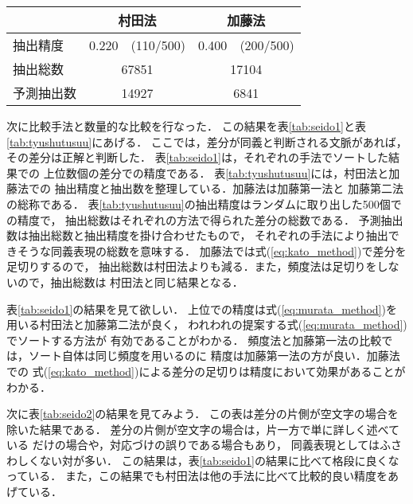 \begin{table*}[t]
  \begin{center}
    \leavevmode
    \caption{抽出精度と抽出数}
    \label{tab:tyushutusuu}
\begin{tabular}[h]{|l|r@{ }c|r@{ }c|}\hline
\multicolumn{1}{|c|}{} & \multicolumn{2}{|c|}{村田法} & \multicolumn{2}{|c|}{加藤法} \\\hline
抽出精度     & 0.220 & (110/500)& 0.400 & (200/500)\\
抽出総数     & \multicolumn{2}{|c|}{67851} & \multicolumn{2}{|c|}{17104} \\
予測抽出数   & \multicolumn{2}{|c|}{14927} & \multicolumn{2}{|c|}{6841} \\\hline
\end{tabular}
\end{center}
\end{table*}

次に比較手法と数量的な比較を行なった．
この結果を表\ref{tab:seido1}と表\ref{tab:tyushutusuu}にあげる．
ここでは，差分が同義と判断される文脈があれば，
その差分は正解と判断した．
表\ref{tab:seido1}は，それぞれの手法でソートした結果での
上位数個の差分での精度である．
表\ref{tab:tyushutusuu}には，村田法と加藤法での
抽出精度と抽出数を整理している．加藤法は加藤第一法と
加藤第二法の総称である．
表\ref{tab:tyushutusuu}の抽出精度はランダムに取り出した500個での精度で，
抽出総数はそれぞれの方法で得られた差分の総数である．
予測抽出数は抽出総数と抽出精度を掛け合わせたもので，
それぞれの手法により抽出できそうな同義表現の総数を意味する．
加藤法では式(\ref{eq:kato_method})で差分を足切りするので，
抽出総数は村田法よりも減る．また，頻度法は足切りをしないので，抽出総数は
村田法と同じ結果となる．

表\ref{tab:seido1}の結果を見て欲しい．
上位での精度は式(\ref{eq:murata_method})を用いる村田法と加藤第二法が良く，
われわれの提案する式(\ref{eq:murata_method})でソートする方法が
有効であることがわかる．
頻度法と加藤第一法の比較では，ソート自体は同じ頻度を用いるのに
精度は加藤第一法の方が良い．加藤法での
式(\ref{eq:kato_method})による差分の足切りは精度において効果があることがわかる．

次に表\ref{tab:seido2}の結果を見てみよう．
この表は差分の片側が空文字の場合を除いた結果である．
差分の片側が空文字の場合は，片一方で単に詳しく述べている
だけの場合や，対応づけの誤りである場合もあり，
同義表現としてはふさわしくない対が多い．
この結果は，表\ref{tab:seido1}の結果に比べて格段に良くなっている．
また，この結果でも村田法は他の手法に比べて比較的良い精度をあげている．

